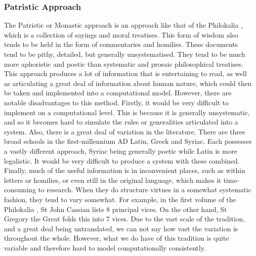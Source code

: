 \documentclass[11pt]{article}
\begin{document}
\subsubsection{Patristic Approach}
The Patristic or Monastic approach is an approach like that of the Philokalia \cite{1983philokalia}, which is a collection of sayings and moral treatises. This form of wisdom also tends to be held in the form of commentaries and homilies. These documents tend to be pithy, detailed, but generally unsystematised. They tend to be much more aphoristic and poetic than systematic and prosaic philosophical treatises. This approach produces a lot of information that is entertaining to read, as well as articulating a great deal of information about human nature, which could then be taken and implemented into a computational model. However, there are notable disadvantages to this method. Firstly, it would be very difficult to implement on a computational level. This is because it is generally unsystematic, and so it becomes hard to simulate the rules or generalities articulated into a system. Also, there is a great deal of variation in the literature. There are three broad schools in the first-millennium AD \: Latin, Greek and Syriac. Each possesses a vastly different approach, Syriac being generally poetic while Latin is more legalistic. It would be very difficult to produce a system with these combined. Finally, much of the useful information is in inconvenient places, such as within letters or homilies, or even still in the original language, which makes it time-consuming to research. When they do structure virtues in a somewhat systematic fashion, they tend to vary somewhat. For example, in the first volume of the Philokalia \cite{1983philokalia}, St John Cassian lists 8 principal vices. On the other hand, St Gregory the Great folds this into 7 vices. Due to the vast scale of the tradition, and a great deal being untranslated, we can not say how vast the variation is throughout the whole. However, what we do have of this tradition is quite variable and therefore hard to model computationally consistently.\\
\end{document}
